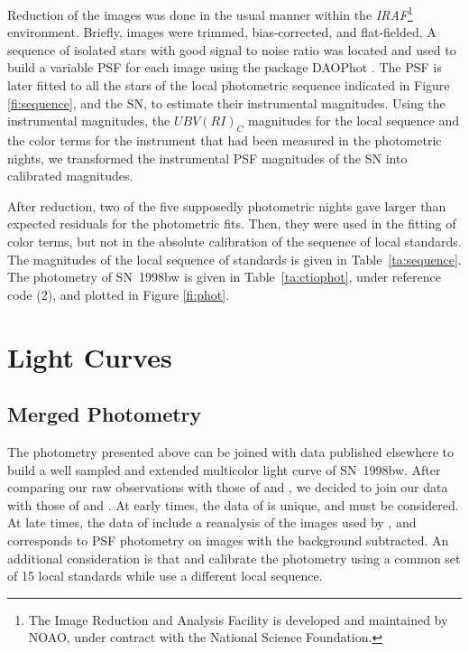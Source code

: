 \documentclass[12pt,preprint]{aastex}
\begin{document}
Reduction of the images was done in the usual manner within the {\em IRAF}\footnote{The Image Reduction and
Analysis Facility is developed and maintained by NOAO, under
contract with the National Science Foundation.} environment.
%
Briefly, images were trimmed, bias-corrected, and flat-fielded.
%
A sequence of isolated stars with good signal to noise ratio was located and used to build a
variable PSF for each image using the package DAOPhot \citep{stetson87}.
%
The PSF is later fitted to all the stars of the local photometric sequence indicated in Figure
\ref{fi:sequence}, and the SN, to estimate their instrumental magnitudes.
%
Using the instrumental magnitudes, the
$UBV(RI)_C$ magnitudes for the local sequence and the color terms for the instrument that had been
measured in the photometric nights, we transformed the instrumental PSF magnitudes of the SN
into calibrated magnitudes.

After reduction, two of the five supposedly photometric nights gave larger than expected residuals for the photometric fits.
%
Then, they were used in the fitting of color terms, but not in the absolute calibration of the sequence of
local standards.
%
The magnitudes of the local sequence of standards is given in Table~\ref{ta:sequence}.
%
The photometry of SN~1998bw is given in Table~\ref{ta:ctiophot}, under reference code (2), and plotted in Figure \ref{fi:phot}.

\section{Light Curves} \label{se:lcurves}

\subsection{Merged Photometry}

The photometry presented above can be joined with data published elsewhere to build a well sampled and
extended multicolor light curve of SN~1998bw.
%
After comparing our raw observations with those of \citet{getal98,mands99} and \citet{soetal02},
we decided to join our data with those of \citet{getal98} and \citet{soetal02}.
%
At early times, the data of \citet{getal98} is unique, and must be considered.
%
At late times, the data of \citet{soetal02} include a reanalysis of the images used by \citet{petal01}, and
corresponds to PSF photometry on images with the background subtracted.
%
An additional consideration is that \citet{getal98} and \citet{soetal02} calibrate the photometry using a common
set of 15 local standards while \citet{mands99} use a different local sequence.
\end{document}
